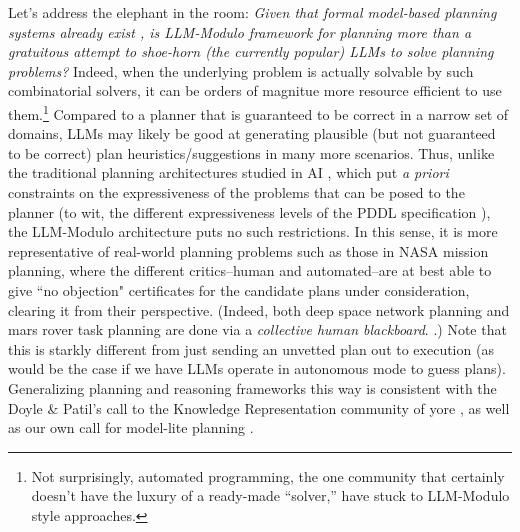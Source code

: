 \documentclass{article}
\newcommand{\bnote}[1]{\color{black}#1\color{black}}
\theoremstyle{plain}
\theoremstyle{definition}
\theoremstyle{remark}
\begin{document}
Let's address the elephant in the room: {\em Given that formal model-based planning systems already exist \cite{ghallab2004automated}, is LLM-Modulo framework for planning more than a gratuitous attempt to shoe-horn (the currently popular) LLMs to solve planning problems?}
\bnote{ Indeed, when the underlying problem is actually solvable by such
  combinatorial solvers, it can be orders of magnitue more resource
  efficient to use them.\footnote{\bnote{Not surprisingly, automated
  programming, the one community
  that certainly doesn't have the luxury of a ready-made ``solver,''
  have stuck to LLM-Modulo style approaches.}}
}
%
Compared to a planner that is guaranteed to be correct in a narrow set of domains, LLMs may likely be good at generating plausible (but not guaranteed to be correct) plan heuristics/suggestions in many more scenarios. 
%
Thus, unlike the traditional planning architectures studied in AI \cite{ghallab2004automated}, which put \textit{a priori} constraints on the expressiveness of the problems that can be posed to the planner (to wit, the different expressiveness levels of the PDDL specification \cite{mcdermott1998pddl}), the LLM-Modulo architecture puts no such restrictions. 
%
%
In this sense, it is more representative of real-world planning problems
such as those in NASA mission planning, where the different
critics--human and automated--are at best able to give ``no objection"
certificates for the candidate plans under consideration,  clearing it from their perspective.
(Indeed, both deep space network planning and mars rover task planning are done via a \textit{collective human blackboard}. \cite{johnston2014automated,bresina2004activity}.) 
Note that this is starkly different from just sending an unvetted plan out to execution (as would be the case if we have LLMs operate in autonomous mode to guess plans). Generalizing planning and reasoning frameworks this way is consistent with the Doyle \& Patil's call to the Knowledge Representation community of yore \cite{twotheses-kr}, as well as our own call for model-lite planning \cite{rao-model-lite}.
\end{document}
